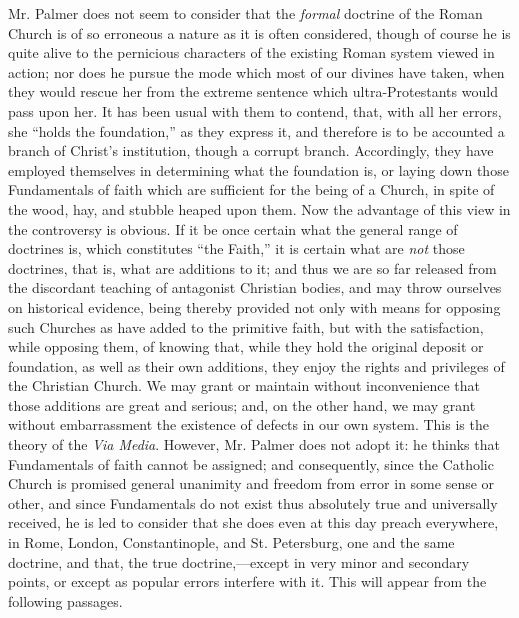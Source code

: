 Mr. Palmer does not seem to consider that the \emph{formal}
doctrine of the Roman Church is of so erroneous a nature as it is
often considered, though of course he is quite alive to the pernicious
characters of the existing Roman system viewed in action; nor does he
pursue the mode which most of our divines have taken, when they would
rescue her from the extreme sentence which ultra-Protestants would pass upon her. It has been usual with them to contend, that,
with all her errors, she ``holds the foundation,'' as they express it,
and therefore is to be accounted a branch of Christ's institution,
though a corrupt branch. Accordingly, they have employed themselves in
determining what the foundation is, or laying down those Fundamentals
of faith which are sufficient for the being of a Church, in spite of
the wood, hay, and stubble heaped upon them. Now the advantage of this
view in the controversy is obvious. If it be once certain what the
general range of doctrines is, which constitutes ``the Faith,'' it is
certain what are \emph{not} those doctrines, that is, what are additions to
it; and thus we are so far released from the discordant teaching of
antagonist Christian bodies, and may throw ourselves on historical
evidence, being thereby provided not only with means for opposing such
Churches as have added to the primitive faith, but with the
satisfaction, while opposing them, of knowing that, while they hold
the original deposit or foundation, as well as their own additions,
they enjoy the rights and privileges of the Christian Church. We may
grant or maintain without inconvenience that those additions are great
and serious; and, on the other hand, we may grant without
embarrassment the existence of defects in our own system. This is the
theory of the \emph{Via Media}. However, Mr. Palmer does not adopt it:
he thinks that Fundamentals of faith cannot be assigned; and
consequently, since the Catholic Church is promised general unanimity
and freedom from error in some sense or other, and since Fundamentals
do not exist thus absolutely true and universally received, he is led
to consider that she does even at this day preach everywhere, in Rome,
London, Constantinople, and St. Petersburg, one and the same doctrine,
and that, the true doctrine,—except in very minor and
secondary points, or except as popular errors interfere with it. This
will appear from the following passages.

